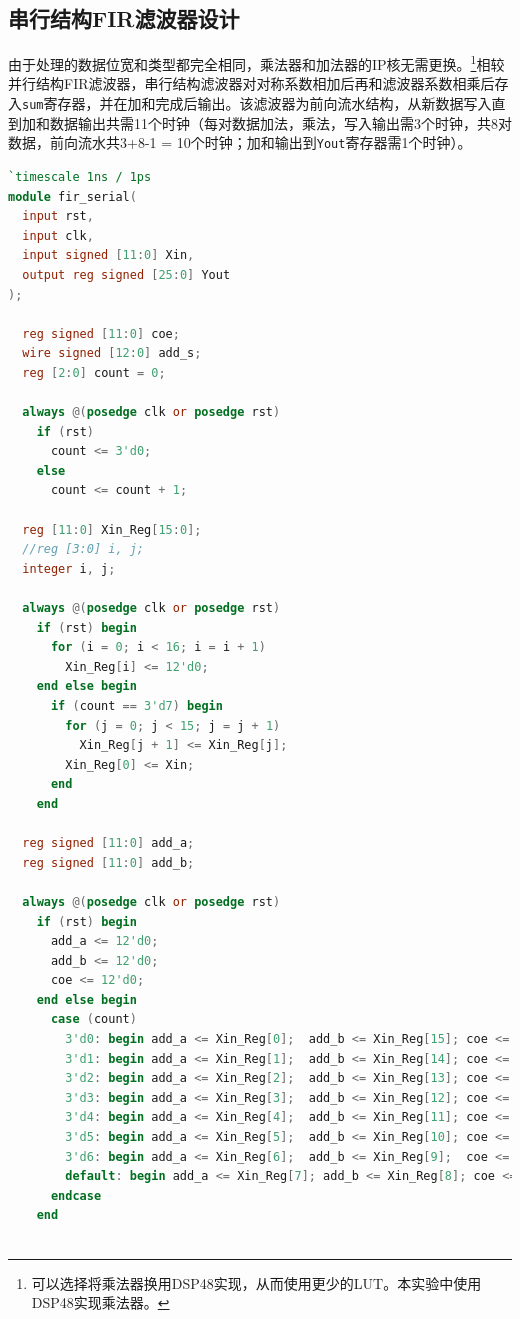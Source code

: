 \subsection{串行结构FIR滤波器设计}
由于处理的数据位宽和类型都完全相同，乘法器和加法器的IP核无需更换。\footnote{可以选择将乘法器换用DSP48实现，从而使用更少的LUT。本实验中使用DSP48实现乘法器。}相较并行结构FIR滤波器，串行结构滤波器对对称系数相加后再和滤波器系数相乘后存入\texttt{sum}寄存器，并在加和完成后输出。该滤波器为前向流水结构，从新数据写入直到加和数据输出共需11个时钟（每对数据加法，乘法，写入输出需3个时钟，共8对数据，前向流水共3+8-1 = 10个时钟；加和输出到\texttt{Yout}寄存器需1个时钟）。
\begin{lstlisting}[language=verilog,caption={串行滤波器模块}]
`timescale 1ns / 1ps
module fir_serial(
  input rst,                         
  input clk,                         
  input signed [11:0] Xin,           
  output reg signed [25:0] Yout      
);

  reg signed [11:0] coe;             
  wire signed [12:0] add_s;          
  reg [2:0] count = 0;               

  always @(posedge clk or posedge rst)
    if (rst)
      count <= 3'd0;
    else
      count <= count + 1;

  reg [11:0] Xin_Reg[15:0];          
  //reg [3:0] i, j;
  integer i, j;
  
  always @(posedge clk or posedge rst)
    if (rst) begin 
      for (i = 0; i < 16; i = i + 1)
        Xin_Reg[i] <= 12'd0;
    end else begin
      if (count == 3'd7) begin
        for (j = 0; j < 15; j = j + 1)
          Xin_Reg[j + 1] <= Xin_Reg[j];
        Xin_Reg[0] <= Xin;
      end
    end

  reg signed [11:0] add_a;
  reg signed [11:0] add_b;

  always @(posedge clk or posedge rst)
    if (rst) begin
      add_a <= 12'd0;
      add_b <= 12'd0;
      coe <= 12'd0;
    end else begin
      case (count)
        3'd0: begin add_a <= Xin_Reg[0];  add_b <= Xin_Reg[15]; coe <= -12'd116; end // c0
        3'd1: begin add_a <= Xin_Reg[1];  add_b <= Xin_Reg[14]; coe <= -12'd111; end // c1
        3'd2: begin add_a <= Xin_Reg[2];  add_b <= Xin_Reg[13]; coe <= -12'd22;  end // c2
        3'd3: begin add_a <= Xin_Reg[3];  add_b <= Xin_Reg[12]; coe <=  12'd243; end // c3
        3'd4: begin add_a <= Xin_Reg[4];  add_b <= Xin_Reg[11]; coe <=  12'd692; end // c4
        3'd5: begin add_a <= Xin_Reg[5];  add_b <= Xin_Reg[10]; coe <= 12'd1239; end // c5
        3'd6: begin add_a <= Xin_Reg[6];  add_b <= Xin_Reg[9];  coe <= 12'd1743; end // c6
        default: begin add_a <= Xin_Reg[7]; add_b <= Xin_Reg[8]; coe <= 12'd2047; end // c7
      endcase
    end



\end{lstlisting}
